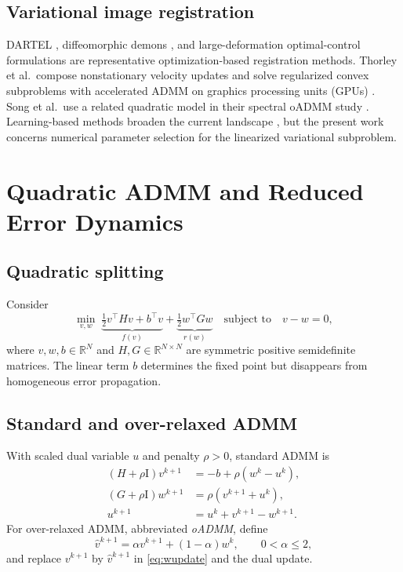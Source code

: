 \documentclass[11pt]{article}
\theoremstyle{definition}
\newcommand{\R}{\mathbb{R}}
\newcommand{\Id}{\mathrm{I}}
\begin{document}
\subsection{Variational image registration}
DARTEL \cite{Ashburner2007}, diffeomorphic demons
\cite{Vercauteren2009}, and large-deformation optimal-control formulations
\cite{MangBiros2015} are representative optimization-based registration
methods. Thorley et al.\ compose nonstationary velocity updates and solve
regularized convex subproblems with accelerated ADMM on graphics processing
units (GPUs)
\cite{Thorley2021}. Song et al.\ use a related quadratic model in their spectral
oADMM study \cite{Song2024}. Learning-based methods broaden the current
landscape \cite{Hering2023}, but the present work concerns numerical parameter
selection for the linearized variational subproblem.

\section{Quadratic ADMM and Reduced Error Dynamics}\label{sec:quadratic}
\subsection{Quadratic splitting}
Consider
\begin{equation}
\min_{v,w}\;
\underbrace{\tfrac12v^\top Hv+b^\top v}_{f(v)}
+\underbrace{\tfrac12w^\top Gw}_{r(w)}
\quad\text{subject to}\quad v-w=0,
\label{eq:split}
\end{equation}
where $v,w,b\in\R^N$ and $H,G\in\R^{N\times N}$ are symmetric positive
semidefinite matrices. The linear term $b$ determines the fixed point but
disappears from homogeneous error propagation.

\subsection{Standard and over-relaxed ADMM}
With scaled dual variable $u$ and penalty $\rho>0$, standard ADMM is
\begin{align}
(H+\rho\Id)v^{k+1}&=-b+\rho(w^k-u^k),\label{eq:vupdate}\\
(G+\rho\Id)w^{k+1}&=\rho(v^{k+1}+u^k),\label{eq:wupdate}\\
u^{k+1}&=u^k+v^{k+1}-w^{k+1}.\label{eq:uupdate}
\end{align}
For over-relaxed ADMM, abbreviated \emph{oADMM}, define
\begin{equation}
\widehat v^{k+1}=\alpha v^{k+1}+(1-\alpha)w^k,
\qquad 0<\alpha\le2,
\label{eq:relaxation}
\end{equation}
and replace $v^{k+1}$ by $\widehat v^{k+1}$ in
\eqref{eq:wupdate} and the dual update.
\end{document}
